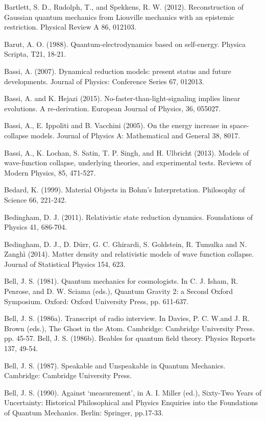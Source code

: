 \begin{thebibliography}{}
\bibitem{} Bartlett, S. D., Rudolph, T., and Spekkens, R. W. (2012). Reconstruction of Gaussian quantum mechanics from Liouville mechanics with an epistemic restriction. Physical Review A 86, 012103.

\bibitem{} Barut, A. O. (1988). Quantum-electrodynamics based on self-energy. Physica Scripta, T21, 18-21. 

\bibitem{}  Bassi, A. (2007). Dynamical reduction models: present status and future developments. Journal of Physics: Conference Series 67, 012013.

\bibitem{}  Bassi, A. and K. Hejazi (2015). No-faster-than-light-signaling implies linear evolutions. A re-derivation. European Journal of Physics, 36, 055027.

\bibitem{} Bassi, A., E. Ippoliti and B. Vacchini (2005). On the energy increase in space-collapse models. Journal of Physics A: Mathematical and General 38, 8017.

\bibitem{} Bassi, A., K. Lochan, S. Satin, T. P. Singh, and H. Ulbricht (2013). Models of wave-function collapse, underlying theories, and experimental tests. Reviews of Modern Physics, 85, 471-527.

\bibitem{} Bedard, K. (1999). Material Objects in Bohm's Interpretation. Philosophy of Science 66, 221-242.

\bibitem{}  Bedingham, D. J. (2011). Relativistic state reduction dynamics. Foundations of Physics 41, 686-704.

\bibitem{}  Bedingham, D. J., D. D\"{u}rr,  G. C. Ghirardi, S. Goldstein, R. Tumulka and  N. Zangh\`{i} (2014). Matter density and relativistic models of wave function collapse. Journal of Statistical Physics 154, 623.

\bibitem{} Bell, J. S. (1981).  Quantum mechanics for cosmologists. In C. J. Isham, R. Penrose, and D. W. Sciama (eds.), Quantum Gravity 2: a Second Oxford Symposium. Oxford: Oxford University Press, pp. 611-637.

\bibitem{} Bell, J. S. (1986a). Transcript of radio interview. In Davies, P. C. W.and J. R. Brown (eds.), The Ghost in the Atom. Cambridge: Cambridge University Press. pp. 45-57.
\bibitem{} Bell, J. S. (1986b). Beables for quantum field theory. Physics Reports 137, 49-54.

\bibitem{} Bell, J. S. (1987).  Speakable and Unspeakable in Quantum Mechanics. Cambridge: Cambridge University Press.

\bibitem{} Bell, J. S. (1990). Against `measurement', in A. I. Miller (ed.), Sixty-Two Years of Uncertainty: Historical Philosophical and Physics Enquiries into the Foundations of Quantum Mechanics. Berlin: Springer, pp.17-33.


\end{thebibliography}
